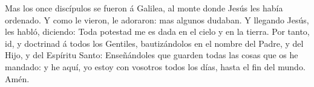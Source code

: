  Mas los once discípulos se fueron á Galilea, al monte
donde Jesús les había ordenado.  Y como le vieron, le
adoraron: mas algunos dudaban.  Y llegando Jesús, les
habló, diciendo: Toda potestad me es dada en el cielo y en la tierra.
 Por tanto, id, y doctrinad á todos los Gentiles,
bautizándolos en el nombre del Padre, y del Hijo, y del Espíritu Santo:
 Enseñándoles que guarden todas las cosas que os he
mandado: y he aquí, yo estoy con vosotros todos los días, hasta el fin
del mundo. Amén.
